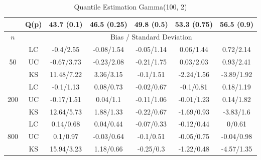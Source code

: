 \documentclass[12pt]{article}
\numberwithin{equation}{section}
\begin{document}
\begin{table} [H]

\begin{center}
\caption{Quantile Estimation Gamma(100, 2)}

\begin{tabular} {| c | c | c | c | c | c | c | } 

	 \hline
		&Q(p)&	43.7 (0.1)&	46.5 (0.25)&	49.8 (0.5)&	53.3 (0.75)&	56.5 (0.9)\\ 
 \hline 
 	$n$ & & \multicolumn{5}{|c|}{Bias / Standard Deviation} 
 \\ 
 \hline 
\multirow{3}{*}{50}		&	LC	&-0.4/2.55	&-0.08/1.54	&-0.05/1.14	&0.06/1.44	&0.72/2.14\\ 
			&	UC	&-0.67/3.73	&-0.23/2.08	&-0.21/1.75	&0.03/2.03	&0.93/2.41\\ 
			&	KS	&11.48/7.22	&3.36/3.15	&-0.1/1.51	&-2.24/1.56	&-3.89/1.92\\ 
	\hline 
\multirow{3}{*}{200}		&	LC	&-0.1/1.13	&0.08/0.73	&-0.02/0.67	&-0.1/0.81	&0.18/1.19\\ 
			&	UC	&-0.17/1.51	&0.04/1.1	&-0.11/1.06	&-0.01/1.23	&0.14/1.82\\ 
			&	KS	&12.64/5.73	&1.88/1.33	&-0.22/0.67	&-1.69/0.93	&-3.83/1.6\\ 
	\hline 
\multirow{3}{*}{800}		&	LC	&0.14/0.68	&0.04/0.44	&-0.07/0.33	&-0.12/0.44	&0/0.61\\ 
			&	UC	&0.1/0.97	&-0.03/0.64	&-0.1/0.51	&-0.05/0.75	&-0.04/0.98\\ 
			&	KS	&15.94/3.23	&1.18/0.66	&-0.25/0.3	&-1.22/0.48	&-4.57/1.35\\ 
	\hline 

\end{tabular}
\end{center}

\end{table}
\end{document}
